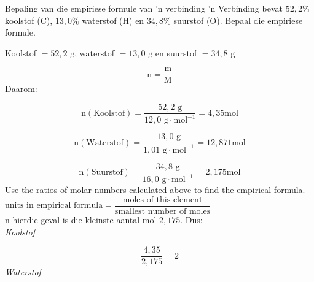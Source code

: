     \noindent
\label{m38712*secfhsst!!!underscore!!!id1029}
      \noindent 
      \begin{wex}{Bepaling van die empiriese formule van 'n verbinding}{
 'n Verbinding bevat $52,2\%$ koolstof ($\text{C}$), $13,0\%$ waterstof ($\text{H}$) en $34,8\%$ suurstof ($\text{O}$). Bepaal die empiriese formule.      
}
{ %
      \label{m38712*id280928}Koolstof $=52,2 \text{ g}$, waterstof $=13,0 \text{ g}$ en suurstof $=34,8 \text{ g}$ 
      \label{m38712*id280954}\nopagebreak\noindent{}
        
    \begin{equation*}
    \text{n}=\frac{\text{m}}{\text{M}}
      \end{equation*}
      \label{m38712*id280975}Daarom: 
      \label{m38712*id280978}\nopagebreak\noindent{}
        
    \begin{equation*}
    \text{n}\left(\text{Koolstof}\right)=\frac{52,2 \text{ g}}{12,0 \text{ g} \cdot \text{mol}^{-1}}=4,35\text{mol}
      \end{equation*}
      \label{m38712*id281042}\nopagebreak\noindent{}
        
    \begin{equation*}
    \text{n}\left(\text{Waterstof}\right)=\frac{13,0 \text{ g}}{1,01 \text{ g} \cdot \text{mol}^{-1}}=12,871\text{mol}
      \end{equation*}
      \label{m38712*id281111}\nopagebreak\noindent{}
        
    \begin{equation*}
    \text{n}\left(\text{Suurstof}\right)=\frac{34,8 \text{ g}}{16,0 \text{ g} \cdot \text{mol}^{-1}}=2,175\text{mol}
      \end{equation*}
Use the ratios of molar numbers calculated above to find the empirical formula.\newline \\
$\text{units in empirical formula} = \dfrac{\text{moles of this element}}{\text{smallest number of moles}}$\newline \\
n hierdie geval is die kleinste aantal mol $2,175$. Dus:\\ 
      \label{m38712*id281179}
        \textsl{Koolstof}
 
      \label{m38712*id281185}\nopagebreak\noindent{}
        
    \begin{equation*}
    \frac{4,35}{2,175}=2
      \end{equation*}
      \label{m38712*id281217}
        \textsl{Waterstof}
     
}
\end{wex}
